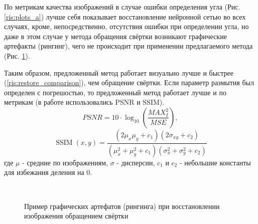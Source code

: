 По метрикам качества изображений в случае ошибки определения угла (Рис. \ref{ris:plots_a}) лучше себя показывает восстановление нейронной сетью во всех случаях, кроме, непосредственно, отсутствия ошибки при определении угла, но даже в этом случае у метода обращения свёртки возникают графические артефакты (рингинг), чего не происходит при применении предлагаемого метода (Рис. \ref{ris:ringing}).
\par
Таким образом, предложенный метод работает визуально лучше и быстрее (\ref{ris:restore_comparison}), чем обращение свёртки. Если параметр размытия был определен с погрешостью, то предложенный метод работает лучше и по метрикам (в работе использовались PSNR и SSIM).
$$
PSNR=10 \cdot \log _{10}\left(\frac{M A X_{I}^{2}}{M S E}\right), 
$$
$$
\operatorname{SSIM}(x, y)=\frac{\left(2 \mu_{x} \mu_{y}+c_{1}\right)\left(2 \sigma_{x y}+c_{2}\right)}{\left(\mu_{x}^{2}+\mu_{y}^{2}+c_{1}\right)\left(\sigma_{x}^{2}+\sigma_{y}^{2}+c_{2}\right)}
$$
где $\mu$ - средние по изображениям, $\sigma$ - дисперсии, $c_1$ и $c_2$ - небольшие константы для избежания деления на 0.
\begin{figure}[H]
\begin{minipage}[t]{0.5\linewidth}
 \\ 
\end{minipage}
\caption{ Пример графических артефатов (рингинга) при восстановлении изображения обращением свёртки }
\label{ris:ringing}
\end{figure}


